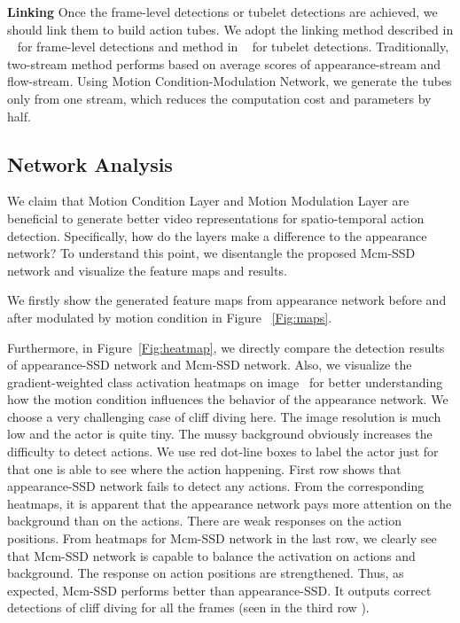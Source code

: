 \documentclass[10pt,twocolumn,letterpaper]{article}
\begin{document}
{\bf{Linking}} Once the frame-level detections or tubelet detections are achieved, we should link them to build action tubes. We adopt the linking method described in ~\cite{Singh2017} for frame-level detections and method in ~\cite{Kalogeithon2017} for tubelet detections. Traditionally, two-stream method performs based on average scores of appearance-stream and flow-stream. Using Motion Condition-Modulation Network, we generate the tubes only from one stream, which reduces the computation cost and parameters by half.  

\subsection{Network Analysis}
We claim that Motion Condition Layer and Motion Modulation Layer are beneficial to generate better video representations for spatio-temporal action detection. Specifically, how do the layers make a difference to the appearance network? To understand this point, we disentangle the proposed Mcm-SSD network and visualize the feature maps and results. 

We firstly show the generated feature maps from appearance network before and after modulated by motion condition in Figure ~\ref{Fig:maps}. 

Furthermore, in Figure~\ref{Fig:heatmap}, we directly compare the detection results of appearance-SSD network and Mcm-SSD network. Also, we visualize the gradient-weighted class activation heatmaps on image~\cite{Zhou2015,Utk} for better understanding how the motion condition influences the behavior of the appearance network. We choose a very challenging case of cliff diving here. The image resolution is much low and the actor is quite tiny. The mussy background obviously increases the difficulty to detect actions. We use red dot-line boxes to label the actor just for that one is able to see where the action happening. First row shows that appearance-SSD network fails to detect any actions. From the corresponding heatmaps, it is apparent that the appearance network pays more attention on the background than on the actions. There are weak responses on the action positions. From heatmaps for Mcm-SSD network in the last row, we clearly see that Mcm-SSD network is capable to balance the activation on actions and background. The response on action positions are strengthened. Thus, as expected, Mcm-SSD performs better than appearance-SSD. It outputs correct detections of cliff diving for all the frames (seen in the third row ).     
\end{document}

